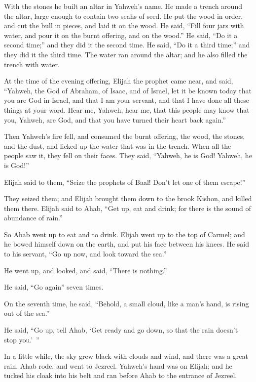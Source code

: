 {With the stones he built an altar in Yahweh’s name. He made a trench around the altar, large enough to contain two seahs of seed.
He put the wood in order, and cut the bull in pieces, and laid it on the wood. He said, “Fill four jars with water, and pour it on the burnt offering, and on the wood.”
He said, “Do it a second time;” and they did it the second time. He said, “Do it a third time;” and they did it the third time.
The water ran around the altar; and he also filled the trench with water.
\par }{\PP {}At the time of the evening offering, Elijah the prophet came near, and said, “Yahweh, the God of Abraham, of Isaac, and of Israel, let it be known today that you are God in Israel, and that I am your servant, and that I have done all these things at your word.
Hear me, Yahweh, hear me, that this people may know that you, Yahweh, are God, and that you have turned their heart back again.”
\par }{\PP {}Then Yahweh’s fire fell, and consumed the burnt offering, the wood, the stones, and the dust, and licked up the water that was in the trench.
When all the people saw it, they fell on their faces. They said, “Yahweh, he is God! Yahweh, he is God!”
\par }{\PP {}Elijah said to them, “Seize the prophets of Baal! Don’t let one of them escape!”
\par }{\PP They seized them; and Elijah brought them down to the brook Kishon, and killed them there.
Elijah said to Ahab, “Get up, eat and drink; for there is the sound of abundance of rain.”
\par }{\PP {}So Ahab went up to eat and to drink. Elijah went up to the top of Carmel; and he bowed himself down on the earth, and put his face between his knees.
He said to his servant, “Go up now, and look toward the sea.”
\par }{\PP He went up, and looked, and said, “There is nothing.”
\par }{\PP He said, “Go again” seven times.
\par }{\PP {}On the seventh time, he said, “Behold, a small cloud, like a man’s hand, is rising out of the sea.”
\par }{\PP He said, “Go up, tell Ahab, ‘Get ready and go down, so that the rain doesn’t stop you.’ ”
\par }{\PP {}In a little while, the sky grew black with clouds and wind, and there was a great rain. Ahab rode, and went to Jezreel.
Yahweh’s hand was on Elijah; and he tucked his cloak into his belt and ran before Ahab to the entrance of Jezreel.

}
